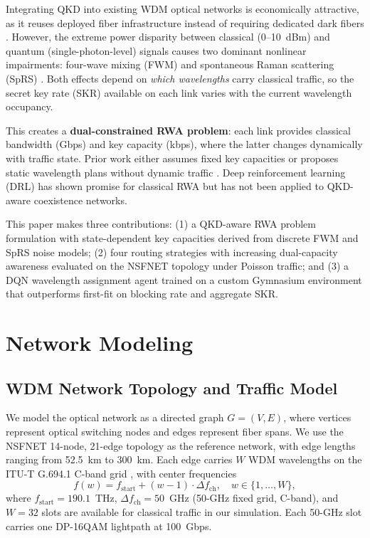 \documentclass[conference]{IEEEtran}
\begin{document}
Integrating QKD into existing WDM optical networks is economically attractive, as it reuses deployed fiber infrastructure instead of requiring dedicated dark fibers \cite{b2}. However, the extreme power disparity between classical (0--10~dBm) and quantum (single-photon-level) signals causes two dominant nonlinear impairments: four-wave mixing (FWM) and spontaneous Raman scattering (SpRS) \cite{b8,b9}. Both effects depend on \emph{which wavelengths} carry classical traffic, so the secret key rate (SKR) available on each link varies with the current wavelength occupancy.

This creates a \textbf{dual-constrained RWA problem}: each link provides classical bandwidth (Gbps) and key capacity (kbps), where the latter changes dynamically with traffic state. Prior work either assumes fixed key capacities \cite{b4} or proposes static wavelength plans without dynamic traffic \cite{b6}. Deep reinforcement learning (DRL) has shown promise for classical RWA \cite{b7} but has not been applied to QKD-aware coexistence networks.

This paper makes three contributions: (1) a QKD-aware RWA problem formulation with state-dependent key capacities derived from discrete FWM and SpRS noise models; (2) four routing strategies with increasing dual-capacity awareness evaluated on the NSFNET topology under Poisson traffic; and (3) a DQN wavelength assignment agent trained on a custom Gymnasium environment that outperforms first-fit on blocking rate and aggregate SKR.

\section{Network Modeling}

\subsection{WDM Network Topology and Traffic Model}

We model the optical network as a directed graph $G = (V, E)$, where vertices represent optical switching nodes and edges represent fiber spans. We use the NSFNET 14-node, 21-edge topology as the reference network, with edge lengths ranging from 52.5~km to 300~km. Each edge carries $W$ WDM wavelengths on the ITU-T G.694.1 C-band grid \cite{b14}, with center frequencies
\begin{equation}
f(w) = f_{\text{start}} + (w - 1) \cdot \Delta f_{\text{ch}}, \quad w \in \{1, \ldots, W\},
\label{eq:itu_grid}
\end{equation}
where $f_{\text{start}} = 190.1$~THz, $\Delta f_{\text{ch}} = 50$~GHz (50-GHz fixed grid, C-band), and $W = 32$ slots are available for classical traffic in our simulation.  Each 50-GHz slot carries one DP-16QAM lightpath at 100~Gbps.
\end{document}
